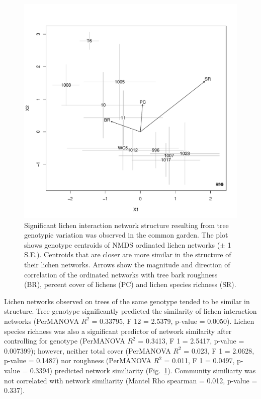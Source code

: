 \documentclass[9pt,twocolumn,twoside,lineno]{pnas-new}
\begin{document}
{\begin{figure}[ht]
\centering
\includegraphics[width=\linewidth]{cn_chplot.pdf}
\caption{Significant lichen interaction network structure resulting
  from tree genotypic variation was observed in the common garden.
  The plot shows genotype centroids of NMDS ordinated lichen networks
  ($\pm$ 1 S.E.). Centroids that are closer are more similar in the
  structure of their lichen networks. Arrows show the magnitude and
  direction of correlation of the ordinated networks with tree bark
  roughness (BR), percent cover of lichens (PC) and lichen species
  richness (SR).}
\label{fig:cn_ch_plot}
\end{figure}


Lichen networks observed on trees of the same genotype tended to be
similar in structure. Tree genotype significantly predicted the
similarity of lichen interaction networks (PerMANOVA $R^2$ = 0.33795,
F 12 = 2.5379, p-value = 0.0050). Lichen species richness was also a
significant predictor of network similarity after controlling for
genotype (PerMANOVA $R^2$ = 0.3413, F 1 = 2.5417, p-value = 0.007399);
however, neither total cover (PerMANOVA $R^2$ = 0.023, F 1 = 2.0628,
p-value = 0.1487) nor roughness (PerMANOVA $R^2$ = 0.011, F 1 =
0.0497, p-value = 0.3394) predicted network similiarity
(Fig.~\ref{fig:cn_ch_plot}). Community similiarty was not correlated
with network similiarity (Mantel Rho spearman = 0.012, p-value =
0.337).


}
\end{document}
